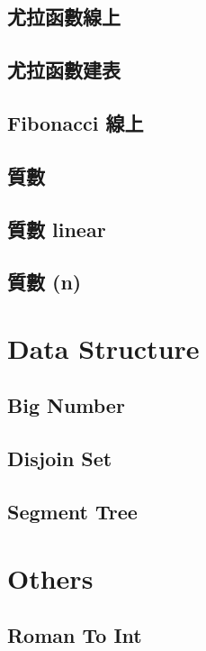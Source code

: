 \subsection{尤拉函數線上}

\subsection{尤拉函數建表}

\subsection{Fibonacci 線上}

\subsection{質數}

\subsection{質數 linear}

\subsection{質數 (n)}


\section{Data Structure}
\subsection{Big Number}

\subsection{Disjoin Set}

\subsection{Segment Tree}


\section{Others}
\subsection{Roman To Int}
